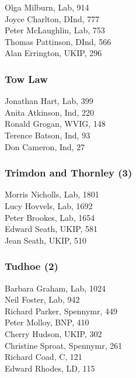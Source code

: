 \documentclass[a4paper,openany,10pt]{book}
\begin{document}
Olga Milburn, Lab, 914\\
Joyce Charlton, DInd, 777\\
Peter McLaughlin, Lab, 753\\
Thomas Pattinson, DInd, 566\\
Alan Errington, UKIP, 296\\


\subsubsection*{Tow Law}



Jonathan Hart, Lab, 399\\
Anita Atkinson, Ind, 220\\
Ronald Grogan, WVIG, 148\\
Terence Batson, Ind, 93\\
Don Cameron, Ind, 27\\


\subsubsection*{Trimdon and Thornley (3)}



Morris Nicholls, Lab, 1801\\
Lucy Hovvels, Lab, 1692\\
Peter Brookes, Lab, 1654\\
Edward Seath, UKIP, 581\\
Jean Seath, UKIP, 510\\


\subsubsection*{Tudhoe (2)}



Barbara Graham, Lab, 1024\\
Neil Foster, Lab, 942\\
Richard Parker, Spennymr, 449\\
Peter Molloy, BNP, 410\\
Cherry Hudson, UKIP, 302\\
Christine Sproat, Spennymr, 261\\
Richard Coad, C, 121\\
Edward Rhodes, LD, 115\\
\end{document}
